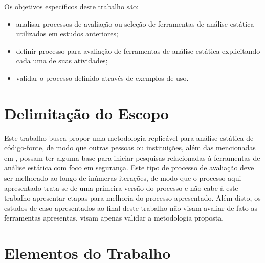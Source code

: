 Os objetivos específicos deste trabalho são:
\begin{itemize}
    \item analisar processos de avaliação ou seleção de ferramentas de análise estática utilizados em estudos anteriores;
    \item definir processo para avaliação de ferramentas de análise estática explicitando cada uma de suas atividades;
    \item validar o processo definido através de exemplos de uso.
\end{itemize}
\section*{Delimitação do Escopo}

Este trabalho busca propor uma metodologia replicável para análise estática de código-fonte, de modo que outras pessoas ou instituições, além das mencionadas em , possam ter alguma base para iniciar pesquisas relacionadas à ferramentas de análise estática com foco em segurança. Este tipo de processo de avaliação deve ser melhorado ao longo de inúmeras iterações, de modo que o processo aqui apresentado trata-se de uma primeira versão do processo e não cabe à este trabalho apresentar etapas para melhoria do processo apresentado. Além disto, os estudos de caso apresentados ao final deste trabalho não visam avaliar de fato as ferramentas apresentas, visam apenas validar a metodologia proposta.


\section*{Elementos do Trabalho}

